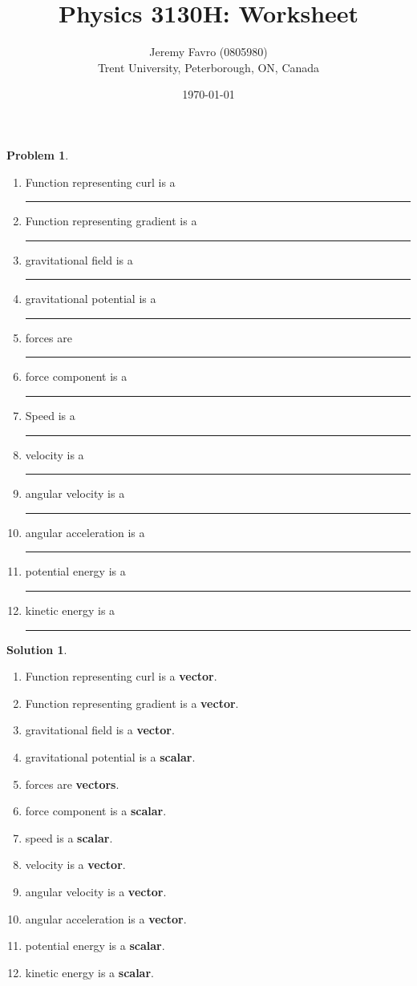 \documentclass[10pt]{article}
\title{Physics 3130H: Worksheet}
\author{Jeremy Favro (0805980) \\ Trent University, Peterborough, ON, Canada}
\date{\today}
\theoremstyle{definition}
\newtheorem{problem}{Problem}
\newtheorem{soln}{Solution}
\begin{document}
\maketitle

\begin{problem}
\begin{enumerate}[label=(\alph*)]
  \item Function representing curl is a \rule{1cm}{0.15mm}
  \item Function representing gradient is a \rule{1cm}{0.15mm}
  \item gravitational field is a \rule{1cm}{0.15mm}
  \item gravitational potential is a \rule{1cm}{0.15mm}
  \item forces are \rule{1cm}{0.15mm}
  \item force component is a \rule{1cm}{0.15mm}
  \item Speed is a \rule{1cm}{0.15mm}
  \item velocity is a \rule{1cm}{0.15mm}
  \item angular velocity is a \rule{1cm}{0.15mm}
  \item angular acceleration is a \rule{1cm}{0.15mm}
  \item potential energy is a \rule{1cm}{0.15mm}
  \item kinetic energy is a \rule{1cm}{0.15mm}
\end{enumerate}
\end{problem}
\begin{soln}~
  \begin{enumerate}[label=(\alph*)]
    \item Function representing curl is a \textbf{vector}.
    \item Function representing gradient is a \textbf{vector}.
    \item gravitational field is a \textbf{vector}.
    \item gravitational potential is a \textbf{scalar}.
    \item forces are \textbf{vectors}.
    \item force component is a \textbf{scalar}.
    \item speed is a \textbf{scalar}.
    \item velocity is a \textbf{vector}.
    \item angular velocity is a \textbf{vector}.
    \item angular acceleration is a \textbf{vector}.
    \item potential energy is a \textbf{scalar}.
    \item kinetic energy is a \textbf{scalar}.
  \end{enumerate}
\end{soln}
\newpage
\end{document}
